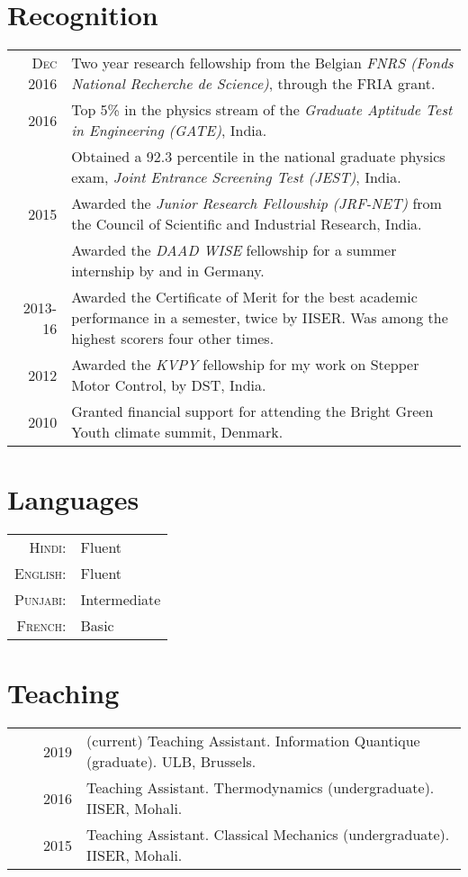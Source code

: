 \documentclass[a4paper,10pt]{article}
\begin{document}
\section{Recognition }
\begin{tabular}{rp{11cm}}
 \textsc{Dec} 2016 & Two year research fellowship from the Belgian \emph{FNRS (Fonds National Recherche de Science)}, through the FRIA grant.\normalsize\\
 2016     & Top 5\% in the physics stream of the \emph{Graduate Aptitude Test in Engineering (GATE)}, India. \\
          & Obtained a 92.3 percentile in the national graduate physics exam, \emph{Joint Entrance Screening Test (JEST)}, India. \\

 2015     & Awarded the \emph{Junior Research Fellowship (JRF-NET)} from the Council of Scientific and Industrial Research, India. \\
          & Awarded the \emph{DAAD WISE} fellowship for a summer internship by and in Germany.\\
 2013-16  & Awarded the Certificate of Merit for the best academic performance in a semester, twice by IISER. Was among the highest scorers four other times.\\
 2012     & Awarded the \emph{KVPY} fellowship for my work on Stepper Motor Control, by DST, India.\\
 2010     & Granted financial support for attending the Bright Green Youth climate summit, Denmark.
\end{tabular}

\section{Languages}
\begin{tabular}{rl}
 \textsc{Hindi:}&Fluent\\
\textsc{English:}&Fluent\\
\textsc{Punjabi:}&Intermediate\\
\textsc{French:}&Basic\\
\end{tabular}

\section{Teaching}
\begin{tabular}{rrp{11cm}}
& ~~2019 &(current) Teaching Assistant. Information Quantique (graduate). ULB, Brussels.\\  
& ~~2016 &Teaching Assistant. Thermodynamics (undergraduate). IISER, Mohali.\\
& ~~2015 &Teaching Assistant. Classical Mechanics (undergraduate). IISER, Mohali.
\end{tabular}
\end{document}
